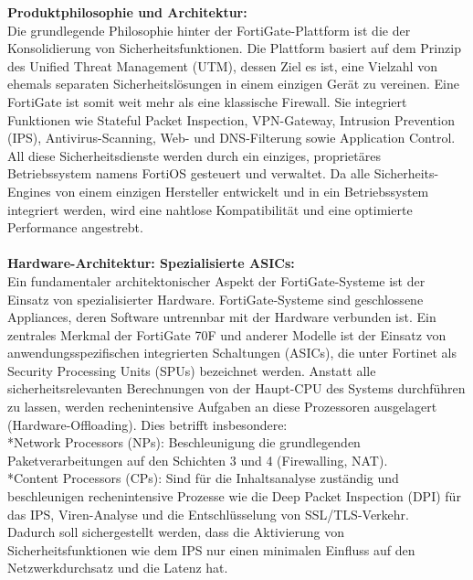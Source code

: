 \textbf{Produktphilosophie und Architektur:}\\
Die grundlegende Philosophie hinter der FortiGate-Plattform ist die der Konsolidierung von Sicherheitsfunktionen. Die Plattform basiert auf dem Prinzip des Unified Threat Management (UTM), dessen Ziel es ist, eine Vielzahl von ehemals separaten Sicherheitslösungen in einem einzigen Gerät zu vereinen. Eine FortiGate ist somit weit mehr als eine klassische Firewall. Sie integriert Funktionen wie Stateful Packet Inspection, VPN-Gateway, Intrusion Prevention (IPS), Antivirus-Scanning, Web- und DNS-Filterung sowie Application Control. All diese Sicherheitsdienste werden durch ein einziges, proprietäres Betriebssystem namens FortiOS gesteuert und verwaltet. Da alle Sicherheits-Engines von einem einzigen Hersteller entwickelt und in ein Betriebssystem integriert werden, wird eine nahtlose Kompatibilität und eine optimierte Performance angestrebt.\cite{Forti}\\\\

\textbf{Hardware-Architektur: Spezialisierte ASICs:}\\
Ein fundamentaler architektonischer Aspekt der FortiGate-Systeme ist der Einsatz von spezialisierter Hardware. FortiGate-Systeme sind geschlossene Appliances, deren Software untrennbar mit der Hardware verbunden ist. Ein zentrales Merkmal der FortiGate 70F und anderer Modelle ist der Einsatz von anwendungsspezifischen integrierten Schaltungen (ASICs), die unter Fortinet als Security Processing Units (SPUs) bezeichnet werden. Anstatt alle sicherheitsrelevanten Berechnungen von der Haupt-CPU des Systems durchführen zu lassen, werden rechenintensive Aufgaben an diese Prozessoren ausgelagert (Hardware-Offloading). Dies betrifft insbesondere:\\
*Network Processors (NPs): Beschleunigung die grundlegenden Paketverarbeitungen auf den Schichten 3 und 4 (Firewalling, NAT).\\
*Content Processors (CPs): Sind für die Inhaltsanalyse zuständig und beschleunigen rechenintensive Prozesse wie die Deep Packet Inspection (DPI) für das IPS, Viren-Analyse und die Entschlüsselung von SSL/TLS-Verkehr.\\

Dadurch soll sichergestellt werden, dass die Aktivierung von Sicherheitsfunktionen wie dem IPS nur einen minimalen Einfluss auf den Netzwerkdurchsatz und die Latenz hat.\cite{Forti2}\\\\

